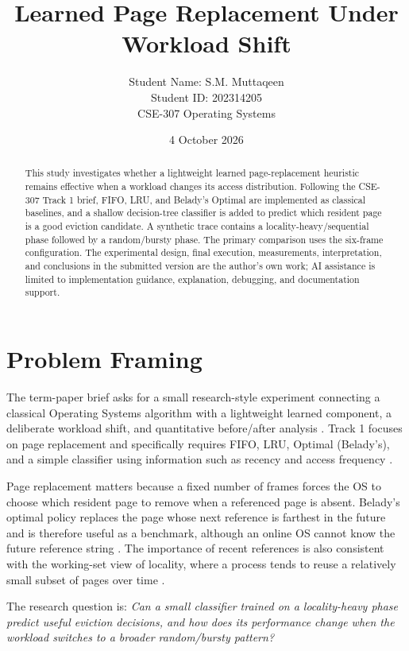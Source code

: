 \documentclass[10pt]{article}
\title{\vspace{-0.4in}\textbf{Learned Page Replacement Under Workload Shift}}
\author{Student Name: S.M. Muttaqeen \\ Student ID: 202314205 \\ CSE-307 Operating Systems}
\date{4 October 2026}
\begin{document}
\maketitle
\vspace{-0.18in}

\begin{abstract}
This study investigates whether a lightweight learned page-replacement heuristic remains effective when a workload changes its access distribution. Following the CSE-307 Track 1 brief, FIFO, LRU, and Belady's Optimal are implemented as classical baselines, and a shallow decision-tree classifier is added to predict which resident page is a good eviction candidate. A synthetic trace contains a locality-heavy/sequential phase followed by a random/bursty phase. The primary comparison uses the six-frame configuration. The experimental design, final execution, measurements, interpretation, and conclusions in the submitted version are the author's own work; AI assistance is limited to implementation guidance, explanation, debugging, and documentation support.
\end{abstract}

\section{Problem Framing}
The term-paper brief asks for a small research-style experiment connecting a classical Operating Systems algorithm with a lightweight learned component, a deliberate workload shift, and quantitative before/after analysis \cite{brief}. Track 1 focuses on page replacement and specifically requires FIFO, LRU, Optimal (Belady's), and a simple classifier using information such as recency and access frequency \cite{brief}.

Page replacement matters because a fixed number of frames forces the OS to choose which resident page to remove when a referenced page is absent. Belady's optimal policy replaces the page whose next reference is farthest in the future and is therefore useful as a benchmark, although an online OS cannot know the future reference string \cite{belady}. The importance of recent references is also consistent with the working-set view of locality, where a process tends to reuse a relatively small subset of pages over time \cite{denning}.

The research question is: \textit{Can a small classifier trained on a locality-heavy phase predict useful eviction decisions, and how does its performance change when the workload switches to a broader random/bursty pattern?}
\end{document}
